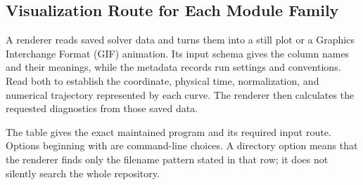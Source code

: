 \subsection{Visualization Route for Each Module Family}

A renderer reads saved solver data and turns them into a still plot or a
Graphics Interchange Format (GIF) animation. Its input schema gives the
column names and their meanings, while the metadata records run settings and
conventions. Read both to establish the coordinate, physical time,
normalization, and numerical trajectory represented by each curve. The
renderer then calculates the requested diagnostics from those saved data.

The table gives the exact maintained program and its required input route.
Options beginning with \code{--} are command-line choices.  A directory option
means that the renderer finds only the filename pattern stated in that row; it
does not silently search the whole repository.

